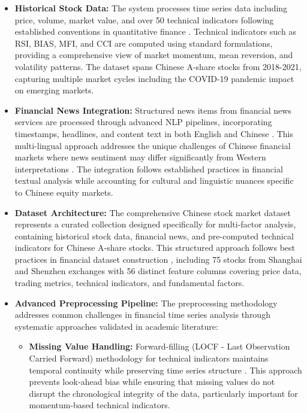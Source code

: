 \documentclass[3p,times,procedia]{elsarticle}
\begin{document}
\begin{itemize}

\item \textbf{Historical Stock Data:} The system processes time series data including price, volume, market value, and over 50 technical indicators following established conventions in quantitative finance \cite{Murphy1999,Wilder1978}. Technical indicators such as RSI, BIAS, MFI, and CCI are computed using standard formulations, providing a comprehensive view of market momentum, mean reversion, and volatility patterns. The dataset spans Chinese A-share stocks from 2018-2021, capturing multiple market cycles including the COVID-19 pandemic impact on emerging markets.

\item \textbf{Financial News Integration:} Structured news items from financial news services are processed through advanced NLP pipelines, incorporating timestamps, headlines, and content text in both English and Chinese \cite{Loughran2011}. This multi-lingual approach addresses the unique challenges of Chinese financial markets where news sentiment may differ significantly from Western interpretations \cite{Xing2018}. The integration follows established practices in financial textual analysis while accounting for cultural and linguistic nuances specific to Chinese equity markets.

\item \textbf{Dataset Architecture:} The comprehensive Chinese stock market dataset \cite{FinReportDataset2025} represents a curated collection designed specifically for multi-factor analysis, containing historical stock data, financial news, and pre-computed technical indicators for Chinese A-share stocks. This structured approach follows best practices in financial dataset construction \cite{Harvey2016}, including 75 stocks from Shanghai and Shenzhen exchanges with 56 distinct feature columns covering price data, trading metrics, technical indicators, and fundamental factors.

\item \textbf{Advanced Preprocessing Pipeline:} The preprocessing methodology addresses common challenges in financial time series analysis through systematic approaches validated in academic literature:

\begin{itemize}
\item \textbf{Missing Value Handling:} Forward-filling (LOCF - Last Observation Carried Forward) methodology for technical indicators maintains temporal continuity while preserving time series structure \cite{Campbell2001}. This approach prevents look-ahead bias while ensuring that missing values do not disrupt the chronological integrity of the data, particularly important for momentum-based technical indicators.


\end{itemize}
\end{itemize}
\end{document}
